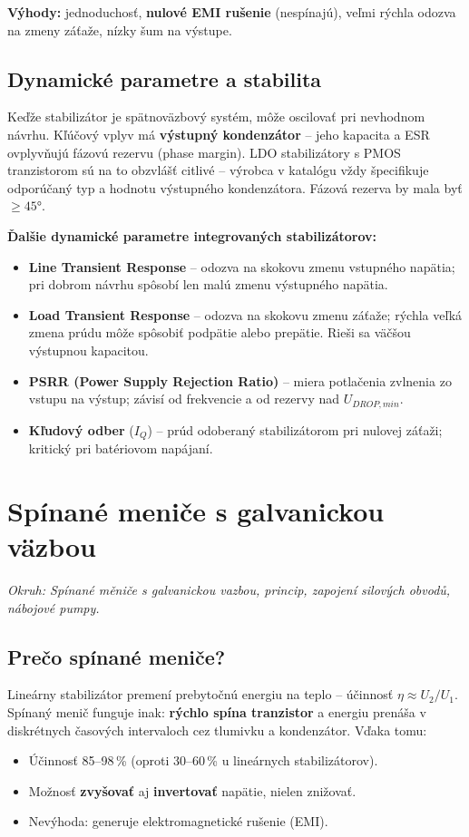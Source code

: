 \textbf{Výhody:} jednoduchosť, \textbf{nulové EMI rušenie} (nespínajú), veľmi rýchla odozva na zmeny záťaže, nízky šum na výstupe.

\section{Dynamické parametre a stabilita}

Keďže stabilizátor je spätnoväzbový systém, môže oscilovať pri nevhodnom návrhu. Kľúčový vplyv má \textbf{výstupný kondenzátor} -- jeho kapacita a ESR ovplyvňujú fázovú rezervu (phase margin). LDO stabilizátory s PMOS tranzistorom sú na to obzvlášť citlivé -- výrobca v katalógu vždy špecifikuje odporúčaný typ a hodnotu výstupného kondenzátora. Fázová rezerva by mala byť $\geq 45°$.

\textbf{Ďalšie dynamické parametre integrovaných stabilizátorov:}
\begin{itemize}
    \item \textbf{Line Transient Response} -- odozva na skokovu zmenu vstupného napätia; pri dobrom návrhu spôsobí len malú zmenu výstupného napätia.
    \item \textbf{Load Transient Response} -- odozva na skokovu zmenu záťaže; rýchla veľká zmena prúdu môže spôsobiť podpätie alebo prepätie. Rieši sa väčšou výstupnou kapacitou.
    \item \textbf{PSRR (Power Supply Rejection Ratio)} -- miera potlačenia zvlnenia zo vstupu na výstup; závisí od frekvencie a od rezervy nad $U_{DROP,min}$.
    \item \textbf{Kľudový odber} ($I_Q$) -- prúd odoberaný stabilizátorom pri nulovej záťaži; kritický pri batériovom napájaní.
\end{itemize}

\chapter{Spínané meniče s galvanickou väzbou}

\textit{Okruh: Spínané měniče s galvanickou vazbou, princip, zapojení silových obvodů, nábojové pumpy.}

\section{Prečo spínané meniče?}

Lineárny stabilizátor premení prebytočnú energiu na teplo -- účinnosť $\eta \approx U_2/U_1$. Spínaný menič funguje inak: \textbf{rýchlo spína tranzistor} a energiu prenáša v diskrétnych časových intervaloch cez tlumivku a kondenzátor. Vďaka tomu:
\begin{itemize}[noitemsep]
    \item Účinnosť 85--98\,\% (oproti 30--60\,\% u lineárnych stabilizátorov).
    \item Možnosť \textbf{zvyšovať} aj \textbf{invertovať} napätie, nielen znižovať.
    \item Nevýhoda: generuje elektromagnetické rušenie (EMI).
\end{itemize}

